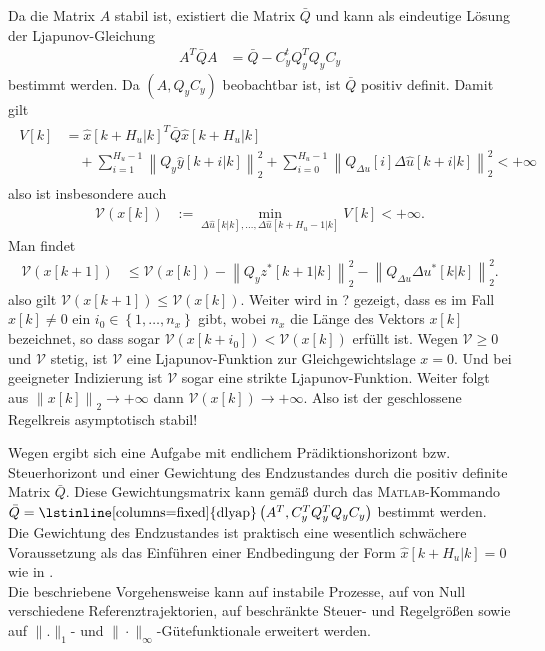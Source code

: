 Da die Matrix $A$ stabil ist, existiert die Matrix $\bar{Q}$ und kann als eindeutige Lösung der Ljapunov-Gleichung
\begin{align}
	A^T\bar{Q}A & = \bar{Q}-C_y^tQ_y^TQ_yC_y \label{eqn:kap_4_ljapunov_glg}
\end{align}
bestimmt werden. Da $(A,Q_yC_y)$ beobachtbar ist, ist $\bar{Q}$ positiv definit. Damit gilt
\begin{align}
\begin{split}\label{eqn:kap_4_guetefunktional_bedingung}
	V[k] & = \hat{x}[k+H_u|k]^T\bar{Q}\hat{x}[k+H_u|k]\\
	& \quad + \sum\limits_{i=1}^{H_u-1}\left\| Q_y\hat{y}[k+i|k]\right\|_2^2+\sum\limits_{i=0}^{H_u-1}\left\| Q_{\Delta u}[i]\Delta \hat{u}[k+i|k]\right\|_2^2 < +\infty  
\end{split}
\end{align}
also ist insbesondere auch
\begin{align}
	\mathcal{V}(x[k]) & := \min\limits_{\Delta\hat{u}[k|k],\ldots,\Delta\hat{u}[k+H_u-1|k]}V[k] < +\infty.
\end{align}
Man findet 
\begin{align*}
	\mathcal{V}(x[k+1]) & \le \mathcal{V}(x[k])-\left\| Q_y z^{\ast}[k+1|k]\right\|_2^2-\left\| Q_{\Delta u}\Delta u^{\ast}[k|k]\right\|_2^2.
\end{align*}
also gilt $\mathcal{V}(x[k+1])\le \mathcal{V}(x[k])$. Weiter wird in ? gezeigt, dass es im Fall $x[k]\neq 0$ ein $i_0\in\left\{ 1,\ldots,n_x \right\}$ gibt, wobei $n_x$ die Länge des
Vektors $x[k]$ bezeichnet, so dass sogar $\mathcal{V}(x[k+i_0])<\mathcal{V}(x[k])$ erfüllt ist. Wegen $\mathcal{V}\ge 0$ und $\mathcal{V}$ stetig, ist $\mathcal{V}$ eine
Ljapunov-Funktion zur Gleichgewichtslage $x=0$. Und bei geeigneter Indizierung ist $\mathcal{V}$ sogar eine strikte Ljapunov-Funktion. Weiter folgt aus $\left\| x[k]
\right\|_2\rightarrow+\infty$ dann $\mathcal{V}(x[k])\rightarrow +\infty$. Also ist der geschlossene Regelkreis asymptotisch stabil!
\begin{remark}
Wegen  ergibt sich eine Aufgabe mit endlichem Prädiktionshorizont bzw. Steuerhorizont und einer Gewichtung des Endzustandes durch die
positiv definite Matrix $\bar{Q}$. Diese Gewichtungsmatrix kann gemäß  durch das \textsc{Matlab}-Kommando
$\bar{Q}=\text{\lstinline[columns=fixed]{dlyap}}\left(A^T,C_y^TQ_y^TQ_yC_y\right)$ bestimmt werden. Die Gewichtung des Endzustandes ist praktisch eine wesentlich schwächere
Voraussetzung als das Einführen einer Endbedingung der Form $\hat{x}[k+H_u|k]=0$ wie in .\\
Die beschriebene Vorgehensweise kann auf instabile Prozesse, auf von Null verschiedene Referenztrajektorien, auf beschränkte Steuer- und Regelgrößen sowie auf $\|.\|_1$- und
$\|\cdot\|_{\infty}$-Gütefunktionale erweitert werden.
\end{remark}

